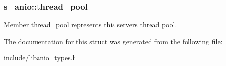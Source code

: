 \subsubsection[{thread\+\_\+pool}]{\setlength{\rightskip}{0pt plus 5cm}s\+\_\+anio\+::thread\+\_\+pool}\label{structs__anio_a2090eced07a64cca0f4a39e0e3928214}
Member \textquotesingle{}thread\+\_\+pool\textquotesingle{} represents this server\textquotesingle{}s thread pool. 

The documentation for this struct was generated from the following file\+:\begin{DoxyCompactItemize}
\item 
include/\hyperlink{libanio__types_8h}{libanio\+\_\+types.\+h}\end{DoxyCompactItemize}
